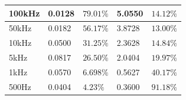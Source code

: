 \documentclass{article}
\begin{document}
\begin{table}[H]
\begin{tabular}{|l|l|l|l|l|}
		100kHz    & 0.0128                                                                                  & $79.01\%$                                                                                          & 5.0550                                                                                          & $14.12\%$                                                                                                  \\ \hline
		50kHz     & 0.0182                                                                                  & $56.17\%$                                                                                          & 3.8728                                                                                          & $13.00\%$                                                                                                  \\ \hline
		10kHz     & 0.0500                                                                                  & $31.25\%$                                                                                          & 2.3628                                                                                          & $14.84\%$                                                                                                  \\ \hline
		5kHz      & 0.0817                                                                                  & $26.50\%$                                                                                          & 2.0404                                                                                          & $19.97\%$                                                                                                  \\ \hline
		1kHz      & 0.0570                                                                                  & $6.698\%$                                                                                          & 0.5627                                                                                          & $40.17\%$                                                                                                  \\ \hline
		500Hz     & 0.0404                                                                                  & $4.23\%$                                                                                           & 0.3600                                                                                          & $91.18\%$                                                                                                  \\ \hline
	\end{tabular}
\end{table}
\end{document}
